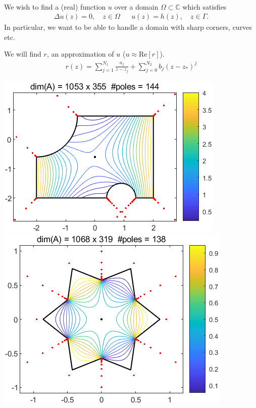\documentclass{seminar}
\begin{document}
\begin{slide} %
{} \small \\

We wish to find a (real) function $u$ over a domain $\Omega \subset \mathds{C}$ which satisfies
\begin{align*}
\Delta u(z)=0, \quad z\in \Omega &&
u(z)=h(z), \quad z\in \Gamma .
\end{align*}
In particular, we want to be able to handle a domain with sharp corners, curves etc. 

We will find $r$, an approximation of $u$ ($u\approx\mathrm{Re}[r]$).
\begin{align*}
r(z)= \sum_{j=1}^{N_1} \frac{a_j}{z-z_j} + \sum_{j=0}^{N_2} b_j (z-z_*)^j
\end{align*}
\begin{multicols}{3}
\includegraphics[scale=.45]{./PNG/Howell_1994}
\includegraphics[scale=.4]{./PNG/snowflake}

\end{multicols}
\end{slide}
\end{document}
